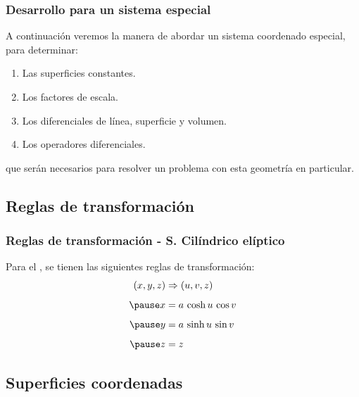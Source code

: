 \documentclass[12pt]{beamer}
\begin{document}
\begin{frame}
\frametitle{Desarrollo para un sistema especial}
A continuación veremos la manera de abordar un sistema coordenado especial, para determinar:
\pause
{}
\begin{enumerate}[<+->]
\item Las superficies constantes.
\item Los factores de escala.
\item Los diferenciales de línea, superficie y volumen.
\item Los operadores diferenciales.
\end{enumerate}
\pause
que serán necesarios para resolver un problema con esta geometría en particular.
\end{frame}

\subsection{Reglas de transformación}

\begin{frame}
\frametitle{Reglas de transformación - S. Cilíndrico elíptico}
Para el , se tienen las siguientes reglas de transformación:
\pause
\begin{eqnarray}
\begin{aligned}
(x, y, z) &\Rightarrow (u, v, z) \\[0.5em] \pause
x &= a \, \cosh u \, \cos v \\[0.5em] \pause
y &= a \, \sinh u \, \sin v \\[0.5em] \pause
z &= z
\end{aligned}
\label{eq:ecuacion_02_73_esp}
\end{eqnarray}
\end{frame}

\subsection{Superficies coordenadas}
\end{document}

